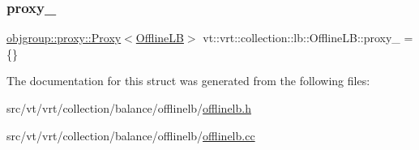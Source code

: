 \subsubsection{\texorpdfstring{proxy\+\_\+}{proxy\_}}
{\footnotesize\ttfamily \hyperlink{structvt_1_1objgroup_1_1proxy_1_1_proxy}{objgroup\+::proxy\+::\+Proxy}$<$\hyperlink{structvt_1_1vrt_1_1collection_1_1lb_1_1_offline_l_b}{Offline\+LB}$>$ vt\+::vrt\+::collection\+::lb\+::\+Offline\+L\+B\+::proxy\+\_\+ = \{\}\hspace{0.3cm}{\ttfamily [private]}}



The documentation for this struct was generated from the following files\+:\begin{DoxyCompactItemize}
\item 
src/vt/vrt/collection/balance/offlinelb/\hyperlink{offlinelb_8h}{offlinelb.\+h}\item 
src/vt/vrt/collection/balance/offlinelb/\hyperlink{offlinelb_8cc}{offlinelb.\+cc}\end{DoxyCompactItemize}
